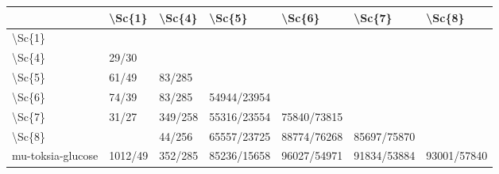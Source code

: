 \begin{tabular}{lllllll}
\toprule
{} &   \textbackslash Sc\{1\} &   \textbackslash Sc\{4\} &       \textbackslash Sc\{5\} &       \textbackslash Sc\{6\} &       \textbackslash Sc\{7\} &       \textbackslash Sc\{8\} \\
\midrule
\textbackslash Sc\{1\}            &          &          &              &              &              &              \\
\textbackslash Sc\{4\}            &    29/30 &          &              &              &              &              \\
\textbackslash Sc\{5\}            &    61/49 &   83/285 &              &              &              &              \\
\textbackslash Sc\{6\}            &    74/39 &   83/285 &  54944/23954 &              &              &              \\
\textbackslash Sc\{7\}            &    31/27 &  349/258 &  55316/23554 &  75840/73815 &              &              \\
\textbackslash Sc\{8\}            &          &   44/256 &  65557/23725 &  88774/76268 &  85697/75870 &              \\
mu-toksia-glucose &  1012/49 &  352/285 &  85236/15658 &  96027/54971 &  91834/53884 &  93001/57840 \\
\bottomrule
\end{tabular}
